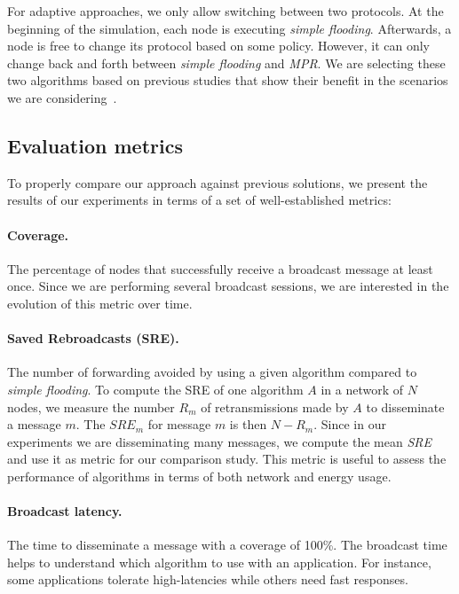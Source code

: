 For adaptive approaches, we only allow switching between two protocols.
%
At the beginning of the simulation, each node is executing \textit{simple flooding}.
%
Afterwards, a node is free to change its protocol based on some policy.
%
However, it can only change back and forth between \textit{simple flooding} and \textit{MPR}.
%
We are selecting these two algorithms based on previous studies that show their benefit in the scenarios we are considering~\cite{DensityMobDrivenEval}.  
%

\subsection{Evaluation metrics}

To properly compare our approach against previous solutions, we present the results of our experiments in terms of a set of well-established metrics:


\paragraph{Coverage.} 
The percentage of nodes that successfully receive a broadcast message at least once.
%
Since we are performing several broadcast sessions, we are interested in the evolution of this metric over time.

%
\paragraph{Saved Rebroadcasts (SRE).} 
The number of forwarding avoided by using a given algorithm  compared to \emph{simple flooding}.
%
To compute the SRE of one algorithm $A$ in a network of $N$ nodes, we measure the number $R_m$ of retransmissions made by $A$ to disseminate a message $m$. The $ \textit{SRE}_m$ for message $m$ is then $N - R_m$.
%
Since in our experiments we are disseminating many messages, we compute the mean \emph{SRE} and use it as metric for our comparison study.
%
This metric is useful to assess the performance of algorithms in terms of both network and energy usage.

%


\paragraph{Broadcast latency.} 
The time to disseminate a message with a coverage of 100\%.
%
The broadcast time helps to understand which algorithm to use with an application.
%
For instance, some applications tolerate high-latencies while others need fast responses.


